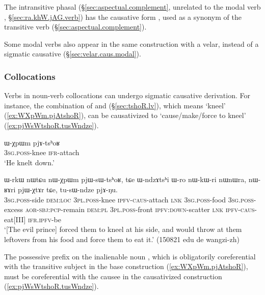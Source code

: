 The intransitive phasal  (§\ref{sec:aspectual.complement}, unrelated to the modal verb , §\ref{sec:ra.khW.jAG.verb}) has the causative form , used as a synonym of the transitive verb  (§\ref{sec:aspectual.complement}).

Some modal verbs also appear in the same construction with a velar, instead of a sigmatic causative (§\ref{sec:velar.caus.modal}).

\subsubsection{Collocations} \label{sec:sig.caus.collocations}
 
Verbs in noun-verb collocations can undergo sigmatic causative derivation. For instance, the combination of  and  (§\ref{sec:tshoR.lv}), which means `kneel' (\ref{ex:WXpWm.pjAtshoR}), can be causativized to  `cause/make/force to kneel' (\ref{ex:pjWsWtshoR.tusWndze}).

\begin{exe}
\ex \label{ex:WXpWm.pjAtshoR}
\gll ɯ-χpɯm pjɤ-tsʰoʁ \\
\textsc{3sg}.\textsc{poss}-knee \textsc{ifr}-attach \\
\glt `He knelt down.' 
\end{exe}

\begin{exe}
\ex \label{ex:pjWsWtshoR.tusWndze}
\gll ɯ-rkɯ nɯtɕu nɯ-χpɯm pjɯ-sɯ-tsʰoʁ, tɕe ɯ-ndzɤtsʰi ɯ-ro nɯ-kɯ-ri nɯnɯra, nɯ-ʁɤri pjɯ-χtɤr tɕe, tu-sɯ-ndze pjɤ-ŋu. \\
\textsc{3sg}.\textsc{poss}-side \textsc{dem}:\textsc{loc} \textsc{3pl}.\textsc{poss}-knee \textsc{ipfv}-\textsc{caus}-attach \textsc{lnk} \textsc{3sg}.\textsc{poss}-food \textsc{3sg}.\textsc{poss}-excess \textsc{aor}-\textsc{sbj}:\textsc{pcp}-remain \textsc{dem}:\textsc{pl} \textsc{3pl}.\textsc{poss}-front \textsc{ipfv}:\textsc{down}-scatter \textsc{lnk} \textsc{ipfv}-\textsc{caus}-eat[III] \textsc{ifr}.\textsc{ipfv}-be \\
\glt `[The evil prince] forced them to kneel at his side, and would throw at them leftovers from his food and force them to eat it.' (150821 edu de wangzi-zh)
\end{exe}

The possessive prefix on the inalienable noun , which is obligatorily coreferential with the transitive subject in the base construction (\ref{ex:WXpWm.pjAtshoR}), must be coreferential with the causee in the causativized construction (\ref{ex:pjWsWtshoR.tusWndze}).


